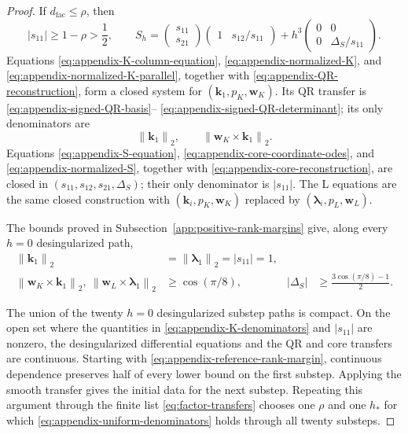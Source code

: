 \documentclass[]{article}
\numberwithin{equation}{section}
\theoremstyle{plain}
\theoremstyle{remark}
\newcommand{\norm}[1]{\left\lVert #1\right\rVert}
\begin{document}
\begin{proof}
If \(d_{\mathrm{fac}}\le\rho\), then
\begin{equation}\label{eq:appendix-s11-lower-bound}
 |s_{11}|\ge1-\rho>\frac12,
 \qquad
 S_h=
 \begin{pmatrix}s_{11}\\s_{21}\end{pmatrix}
 \begin{pmatrix}1&s_{12}/s_{11}\end{pmatrix}
 +h^3\begin{pmatrix}0&0\\0&\Delta_S/s_{11}\end{pmatrix}.
\end{equation}
Equations \eqref{eq:appendix-K-column-equation},
\eqref{eq:appendix-normalized-K}, and
\eqref{eq:appendix-normalized-K-parallel}, together with
\eqref{eq:appendix-QR-reconstruction}, form a closed system for
\((\boldsymbol k_1,p_K,\boldsymbol w_K)\).  Its QR transfer is
\eqref{eq:appendix-signed-QR-basis}--
\eqref{eq:appendix-signed-QR-determinant}; its only denominators are
\begin{equation}\label{eq:appendix-K-denominators}
 \norm{\boldsymbol k_1}_2,
 \qquad
 \norm{\boldsymbol w_K\times\boldsymbol k_1}_2.
\end{equation}
Equations \eqref{eq:appendix-S-equation},
\eqref{eq:appendix-core-coordinate-odes}, and
\eqref{eq:appendix-normalized-S}, together with
\eqref{eq:appendix-core-reconstruction}, are closed in
\((s_{11},s_{12},s_{21},\Delta_S)\); their only denominator is
\(|s_{11}|\).  The L equations are the same closed construction with
\((\boldsymbol k_i,p_K,\boldsymbol w_K)\) replaced by
\((\boldsymbol\lambda_i,p_L,\boldsymbol w_L)\).

The bounds proved in Subsection~\ref{app:positive-rank-margins} give,
along every $h=0$ desingularized path,
\begin{equation}\label{eq:appendix-reference-rank-margin}
\begin{aligned}
 \norm{\boldsymbol k_1}_2
 &=\norm{\boldsymbol\lambda_1}_2=|s_{11}|=1,\\
 \norm{\boldsymbol w_K\times\boldsymbol k_1}_2,
 \ \norm{\boldsymbol w_L\times\boldsymbol\lambda_1}_2
 &\ge\cos(\pi/8),
 &|\Delta_S|&\ge\frac{3\cos(\pi/8)-1}{2}.
\end{aligned}
\end{equation}

The union of the twenty $h=0$ desingularized substep paths is compact.  On the open
set where the quantities in \eqref{eq:appendix-K-denominators} and
\(|s_{11}|\) are nonzero, the desingularized differential equations
and the QR and core transfers are continuous.  Starting with
\eqref{eq:appendix-reference-rank-margin}, continuous dependence
preserves half of every lower bound on the first substep.  Applying the
smooth transfer gives the initial data for the next substep.  Repeating
this argument through the finite list \eqref{eq:factor-transfers}
chooses one \(\rho\) and one \(h_*\) for which
\eqref{eq:appendix-uniform-denominators} holds through all twenty
substeps.


\end{proof}
\end{document}

